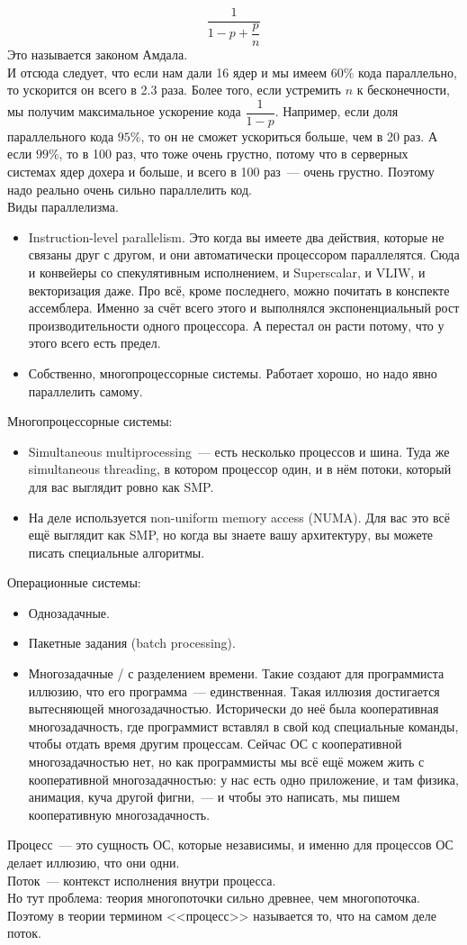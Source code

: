 \documentclass{article}
\begin{document}
\[
\dfrac1{1-p+\dfrac pn}
\]
Это называется законом Амдала.\\
И отсюда следует, что если нам дали 16 ядер и мы имеем $60\%$ кода параллельно, то ускорится он всего в 2.3 раза. Более того, если устремить $n$ к бесконечности, мы получим максимальное ускорение кода $\displaystyle\dfrac 1{1-p}$. Например, если доля параллельного кода $95\%$, то он не сможет ускориться больше, чем в 20 раз. А если $99\%$, то в 100 раз, что тоже очень грустно, потому что в серверных системах ядер дохера и больше, и всего в 100 раз~--- очень грустно. Поэтому надо реально очень сильно параллелить код.\\
Виды параллелизма.
\begin{itemize}
    \item Instruction-level parallelism. Это когда вы имеете два действия, которые не связаны друг с другом, и они автоматически процессором параллелятся. Сюда и конвейеры со спекулятивным исполнением, и Superscalar, и VLIW, и векторизация даже. Про всё, кроме последнего, можно почитать в конспекте ассемблера. Именно за счёт всего этого и выполнялся экспоненциальный рост производительности одного процессора. А перестал он расти потому, что у этого всего есть предел.
    \item Собственно, многопроцессорные системы. Работает хорошо, но надо явно параллелить самому.
\end{itemize}
Многопроцессорные системы:
\begin{itemize}
    \item Simultaneous multiprocessing~--- есть несколько процессов и шина. Туда же simultaneous threading, в котором процессор один, и в нём потоки, который для вас выглядит ровно как SMP.
    \item На деле используется non-uniform memory access (NUMA). Для вас это всё ещё выглядит как SMP, но когда вы знаете вашу архитектуру, вы можете писать специальные алгоритмы.
\end{itemize}
Операционные системы:
\begin{itemize}
    \item Однозадачные.
    \item Пакетные задания (batch processing).
    \item Многозадачные / с разделением времени. Такие создают для программиста иллюзию, что его программа~--- единственная. Такая иллюзия достигается вытесняющей многозадачностью. Исторически до неё была кооперативная многозадачность, где программист вставлял в свой код специальные команды, чтобы отдать время другим процессам. Сейчас ОС с кооперативной многозадачностью нет, но как программисты мы всё ещё можем жить с кооперативной многозадачностью: у нас есть одно приложение, и там физика, анимация, куча другой фигни,~--- и чтобы это написать, мы пишем кооперативную многозадачность.
\end{itemize}
Процесс~--- это сущность ОС, которые независимы, и именно для процессов ОС делает иллюзию, что они одни.\\
Поток~--- контекст исполнения внутри процесса.\\
Но тут проблема: теория многопоточки сильно древнее, чем многопоточка. Поэтому в теории термином <<процесс>> называется то, что на самом деле поток.
\end{document}
